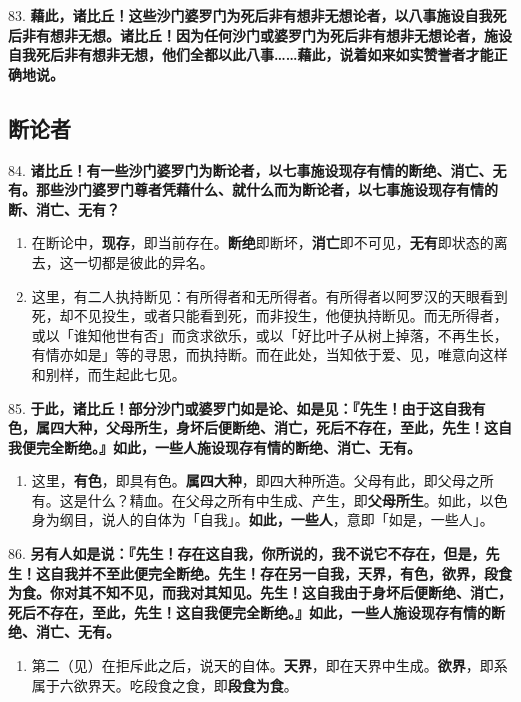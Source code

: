 {\Large 83.} \textbf{藉此，诸比丘！这些沙门婆罗门为死后非有想非无想论者，以八事施设自我死后非有想非无想。诸比丘！因为任何沙门或婆罗门为死后非有想非无想论者，施设自我死后非有想非无想，他们全都以此八事……藉此，说着如来如实赞誉者才能正确地说。}

\subsection{断论者}

{\Large 84.} \textbf{诸比丘！有一些沙门婆罗门为断论者，以七事施设现存有情的断绝、消亡、无有。那些沙门婆罗门尊者凭藉什么、就什么而为断论者，以七事施设现存有情的断、消亡、无有？}

\begin{enumerate}\item 在断论中，\textbf{现存}，即当前存在。\textbf{断绝}即断坏，\textbf{消亡}即不可见，\textbf{无有}即状态的离去，这一切都是彼此的异名。
\item 这里，有二人执持断见：有所得者和无所得者。有所得者以阿罗汉的天眼看到死，却不见投生，或者只能看到死，而非投生，他便执持断见。而无所得者，或以「谁知他世有否」而贪求欲乐，或以「好比叶子从树上掉落，不再生长，有情亦如是」等的寻思，而执持断。而在此处，当知依于爱、见，唯意向这样和别样，而生起此七见。\end{enumerate}

{\Large 85.} \textbf{于此，诸比丘！部分沙门或婆罗门如是论、如是见：『先生！由于这自我有色，属四大种，父母所生，身坏后便断绝、消亡，死后不存在，至此，先生！这自我便完全断绝。』如此，一些人施设现存有情的断绝、消亡、无有。}

\begin{enumerate}\item 这里，\textbf{有色}，即具有色。\textbf{属四大种}，即四大种所造。父母有此，即父母之所有。这是什么？精血。在父母之所有中生成、产生，即\textbf{父母所生}。如此，以色身为纲目，说人的自体为「自我」。\textbf{如此，一些人}，意即「如是，一些人」。\end{enumerate}

{\Large 86.} \textbf{另有人如是说：『先生！存在这自我，你所说的，我不说它不存在，但是，先生！这自我并不至此便完全断绝。先生！存在另一自我，天界，有色，欲界，段食为食。你对其不知不见，而我对其知见。先生！这自我由于身坏后便断绝、消亡，死后不存在，至此，先生！这自我便完全断绝。』如此，一些人施设现存有情的断绝、消亡、无有。}

\begin{enumerate}\item 第二（见）在拒斥此之后，说天的自体。\textbf{天界}，即在天界中生成。\textbf{欲界}，即系属于六欲界天。吃段食之食，即\textbf{段食为食}。\end{enumerate}

